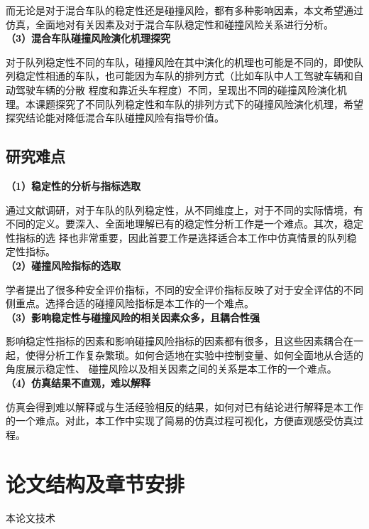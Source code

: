 而无论是对于混合车队的稳定性还是碰撞风险，都有多种影响因素，本文希望通过仿真，全面地对有关因素及对于混合车队稳定性和碰撞风险关系进行分析。\\

\noindent \textbf{（3）混合车队碰撞风险演化机理探究}

对于队列稳定性不同的车队，碰撞风险在其中演化的机理也可能是不同的，即使队列稳定性相通的车队，也可能因为车队的排列方式（比如车队中人工驾驶车辆和自动驾驶车辆的分散
程度和靠近头车程度）不同，呈现出不同的碰撞风险演化机理。本课题探究了不同队列稳定性和车队的排列方式下的碰撞风险演化机理，希望探究结论能对降低混合车队碰撞风险有指导价值。

\subsection{研究难点}

\noindent \textbf{（1）稳定性的分析与指标选取}

通过文献调研，对于车队的队列稳定性，从不同维度上，对于不同的实际情境，有不同的定义。要深入、全面地理解已有的稳定性分析工作是一个难点。其次，稳定性指标的选
择也非常重要，因此首要工作是选择适合本工作中仿真情景的队列稳定性指标。\\

\noindent \textbf{（2）碰撞风险指标的选取}

学者提出了很多种安全评价指标，不同的安全评价指标反映了对于安全评估的不同侧重点。选择合适的碰撞风险指标是本工作的一个难点。 \\

\noindent \textbf{（3）影响稳定性与碰撞风险的相关因素众多，且耦合性强}

影响稳定性指标的因素和影响碰撞风险指标的因素都有很多，且这些因素耦合在一起，使得分析工作复杂繁琐。如何合适地在实验中控制变量、如何全面地从合适的角度展示稳定性、
碰撞风险以及相关因素之间的关系是本工作的一个难点。\\

\noindent \textbf{（4）仿真结果不直观，难以解释}

仿真会得到难以解释或与生活经验相反的结果，如何对已有结论进行解释是本工作的一个难点。对此，本工作中实现了简易的仿真过程可视化，方便直观感受仿真过程。

\section{论文结构及章节安排}

本论文技术


